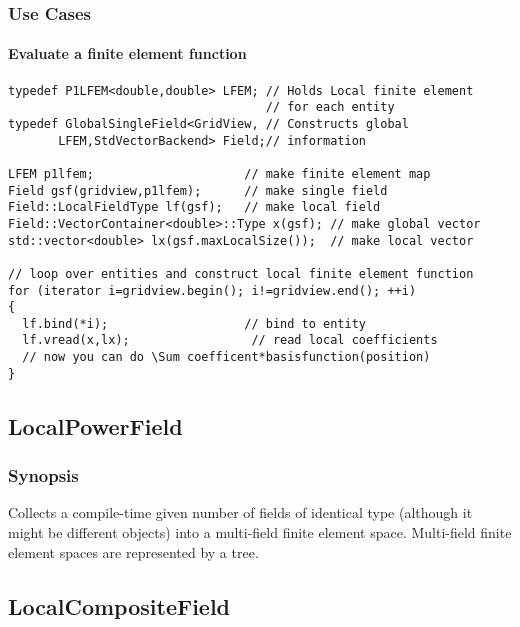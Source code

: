\documentclass[11pt,a4paper,DIV11,%
notitlepage,oneside,abstracton,%
bibtotoc]{scrartcl}
\begin{document}
\subsubsection{Use Cases}

\paragraph{Evaluate a finite element function} \mbox{}

\begin{lstlisting}
typedef P1LFEM<double,double> LFEM; // Holds Local finite element
                                    // for each entity
typedef GlobalSingleField<GridView, // Constructs global 
       LFEM,StdVectorBackend> Field;// information

LFEM p1lfem;                     // make finite element map
Field gsf(gridview,p1lfem);      // make single field
Field::LocalFieldType lf(gsf);   // make local field 
Field::VectorContainer<double>::Type x(gsf); // make global vector
std::vector<double> lx(gsf.maxLocalSize());  // make local vector

// loop over entities and construct local finite element function
for (iterator i=gridview.begin(); i!=gridview.end(); ++i)
{
  lf.bind(*i);                   // bind to entity
  lf.vread(x,lx);                 // read local coefficients
  // now you can do \Sum coefficent*basisfunction(position)
} 
\end{lstlisting}


\subsection{LocalPowerField}

\subsubsection{Synopsis}

Collects a compile-time given number of fields of identical type (although it might
be different objects) into a multi-field finite element space. 
Multi-field finite element spaces are represented by a tree.

\subsection{LocalCompositeField}
\end{document}
